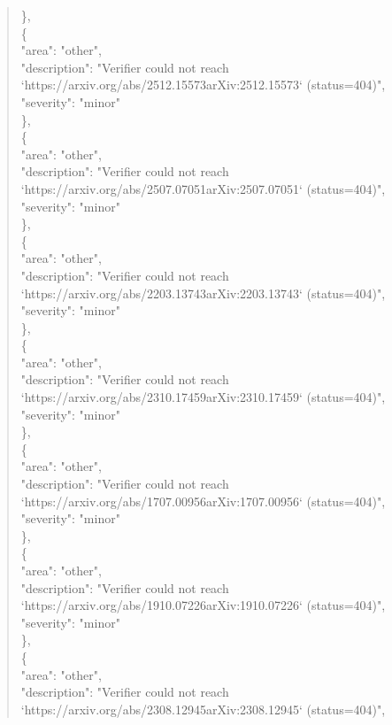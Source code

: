 \documentclass[11pt]{article}
\begin{document}
\begin{quote}
    \},\\
    \{\\
      "area": "other",\\
      "description": "Verifier could not reach `https://arxiv.org/abs/2512.15573arXiv:2512.15573` (status=404)",\\
      "severity": "minor"\\
    \},\\
    \{\\
      "area": "other",\\
      "description": "Verifier could not reach `https://arxiv.org/abs/2507.07051arXiv:2507.07051` (status=404)",\\
      "severity": "minor"\\
    \},\\
    \{\\
      "area": "other",\\
      "description": "Verifier could not reach `https://arxiv.org/abs/2203.13743arXiv:2203.13743` (status=404)",\\
      "severity": "minor"\\
    \},\\
    \{\\
      "area": "other",\\
      "description": "Verifier could not reach `https://arxiv.org/abs/2310.17459arXiv:2310.17459` (status=404)",\\
      "severity": "minor"\\
    \},\\
    \{\\
      "area": "other",\\
      "description": "Verifier could not reach `https://arxiv.org/abs/1707.00956arXiv:1707.00956` (status=404)",\\
      "severity": "minor"\\
    \},\\
    \{\\
      "area": "other",\\
      "description": "Verifier could not reach `https://arxiv.org/abs/1910.07226arXiv:1910.07226` (status=404)",\\
      "severity": "minor"\\
    \},\\
    \{\\
      "area": "other",\\
      "description": "Verifier could not reach `https://arxiv.org/abs/2308.12945arXiv:2308.12945` (status=404)",\\

\end{quote}
\end{document}
